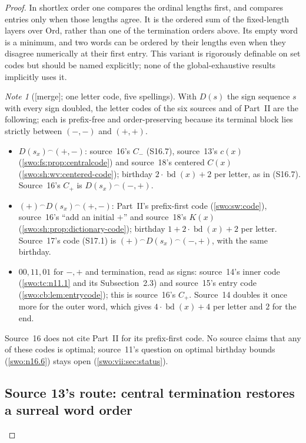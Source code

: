 \documentclass[11pt]{article}
\theoremstyle{definition}
\theoremstyle{remark}
\newtheorem{note}[note]{Note}
\newcommand{\Ord}{\mathrm{Ord}}
\newcommand{\bd}{\operatorname{bd}}
\newcommand{\cat}{\mathbin{{}^\frown}}
\newcommand{\merge}{\textsf{[merge]}}
\begin{document}
\begin{proof}
In shortlex order one compares the ordinal lengths first, and compares
entries only when those lengths agree. It is the ordered sum of the
fixed-length layers over $\Ord$, rather than one of the termination
orders above. Its empty word is a minimum, and two words can be ordered
by their lengths even when they disagree numerically at their first
entry. This variant is rigorously definable on set codes but should be
named explicitly; none of the global-exhaustive results implicitly uses it.

\begin{note}[\merge; one letter code, five spellings]\label{swo:vii:note:codes}
With $D(s)$ the sign sequence $s$ with every sign doubled, the letter codes
of the six sources and of Part~II are the following; each is prefix-free and
order-preserving because its terminal block lies strictly between $(-,-)$ and
$(+,+)$.
\begin{itemize}
\item $D(s_x)\cat(+,-)$: source~16's $C_-$ (S16.7), source~13's $c(x)$
(\cref{swo:fs:prop:centralcode}) and source~18's centered $C(x)$
(\cref{swo:sh:wv:centered-code}); birthday $2\cdot\bd(x)+2$ per letter, as in
(S16.7). Source~16's $C_+$ is $D(s_x)\cat(-,+)$.
\item $(+)\cat D(s_x)\cat(+,-)$: Part~II's prefix-first code (\cref{swo:sw:code}),
source~16's ``add an initial $+$'' and source~18's $K(x)$
(\cref{swo:sh:prop:dictionary-code}); birthday $1+2\cdot\bd(x)+2$ per letter.
Source~17's code (S17.1) is $(+)\cat D(s_x)\cat(-,+)$, with the same birthday.
\item $00,11,01$ for $-,+$ and termination, read as signs: source~14's inner
code (\cref{swo:tc:n11.1} and its Subsection~2.3) and source~15's entry code
(\cref{swo:cb:lem:entrycode}); this is source~16's $C_+$. Source~14 doubles it
once more for the outer word, which gives $4\cdot\bd(x)+4$ per letter and $2$
for the end.
\end{itemize}
Source~16 does not cite Part~II for its prefix-first code. No source claims
that any of these codes is optimal; source~11's question on optimal birthday
bounds (\cref{swo:n16.6}) stays open (\cref{swo:vii:sec:status}).
\end{note}

\subsection{Source 13's route: central termination restores a surreal word order}\label{swo:fs:sec:central}


\end{proof}
\end{document}
